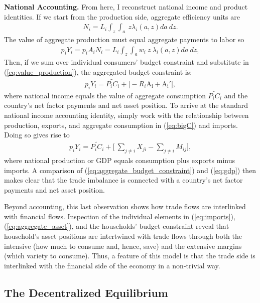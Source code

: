 \documentclass[12pt,pdftex]{article}
\begin{document}
\begin{onehalfspacing}
\textbf{National Accounting.} From here, I reconstruct national income and product identities. If we start from the production side, aggregate efficiency units are
\begin{align}
N_i = L_{i}\int_{z} \int_{a}\ z \lambda_i(a, z) da \ dz. \label{eq:ag-labor-supply}
\end{align}
The value of aggregate production must equal aggregate payments to labor so
\begin{align}
p_{i} Y_{i} = p_{i} A_{i} N_{i} = L_i \int_{z} \int_{a} w_{i} \ z \ \lambda_i(a, z) da \ dz,
\label{eq:value_production}
\end{align}
Then, if we sum over individual consumers' budget constraint and substitute in (\ref{eq:value_production}), the aggregated budget constraint is:
\begin{align}
p_{i} Y_{i}  = \widetilde{P_{i} C_i}  + \bigg[-R_i\mathrm{A_i} +  \mathrm{A_i'} \bigg],
\label{eq:aggregate_budget_constraint}
\end{align}
where national income equals the value of aggregate consumption $\widetilde{P_{i} C_i}$ and the country's net factor payments and net asset position. To arrive at the standard national income accounting identity, simply work with the relationship between production, exports, and aggregate consumption in (\ref{eq:bigC}) and imports. Doing so gives rise to
\begin{align}
p_{i} Y_{i}  = \widetilde{P_{i} C_i} + \bigg[\ \sum_{j\neq i}X_{ji} -  \sum_{j\neq i}M_{ij} \bigg],
\label{eq:gdp}
\end{align}
where national production or GDP equals consumption plus exports minus imports. A comparison of (\ref{eq:aggregate_budget_constraint}) and (\ref{eq:gdp}) then makes clear that the trade imbalance is connected with a country's net factor payments and net asset position.

Beyond accounting, this last observation shows how trade flows are interlinked with financial flows. Inspection of the individual elements in (\ref{eq:imports}), (\ref{eq:aggregate_asset}), and the households' budget constraint reveal that household's asset positions are intertwined with trade flows through both the intensive (how much to consume and, hence, save) and the extensive margins (which variety to consume). Thus, a feature of this model is that the trade side is interlinked with the financial side of the economy in a non-trivial way.

\subsection{The Decentralized Equilibrium}


\end{onehalfspacing}
\end{document}

